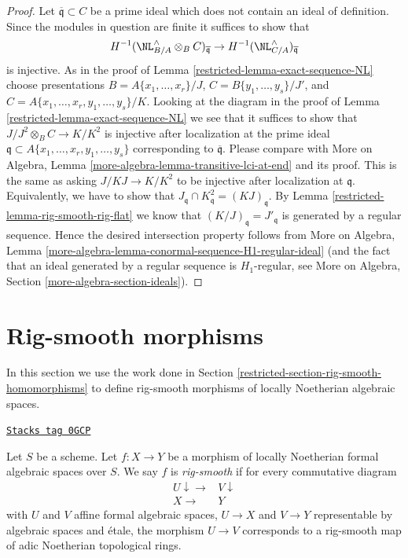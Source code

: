 \begin{proof}

Let $\overline{\mathfrak q} \subset C$ be a prime ideal which does not contain
an ideal of definition. Since the modules in question are finite
it suffices to show that
$$
H^{-1}(\NL_{B/A}^\wedge \otimes_B C)_{\overline{\mathfrak q}} \to
H^{-1}(\NL_{C/A}^\wedge)_{\overline{\mathfrak q}}
$$
is injective. As in the proof of Lemma \ref{restricted-lemma-exact-sequence-NL}
choose presentations $B = A\{x_1, \ldots, x_r\}/J$,
$C = B\{y_1, \ldots, y_s\}/J'$, and
$C = A\{x_1, \ldots, x_r, y_1, \ldots, y_s\}/K$.
Looking at the diagram in the proof of Lemma \ref{restricted-lemma-exact-sequence-NL}
we see that it suffices to show that $J/J^2 \otimes_B C \to K/K^2$
is injective after localization at the prime ideal
$\mathfrak q \subset A\{x_1, \ldots, x_r, y_1, \ldots, y_s\}$
corresponding to $\overline{\mathfrak q}$. Please compare with
More on Algebra, Lemma \ref{more-algebra-lemma-transitive-lci-at-end}
and its proof. This is the same as
asking $J/KJ \to K/K^2$ to be injective after localization
at $\mathfrak q$. Equivalently, we have to show that
$J_\mathfrak q \cap K^2_\mathfrak q = (KJ)_\mathfrak q$.
By Lemma \ref{restricted-lemma-rig-smooth-rig-flat}
we know that $(K/J)_\mathfrak q = J'_\mathfrak q$
is generated by a regular sequence.
Hence the desired intersection property follows from
More on Algebra, Lemma
\ref{more-algebra-lemma-conormal-sequence-H1-regular-ideal}
(and the fact that an ideal generated by a regular sequence
is $H_1$-regular, see
More on Algebra, Section \ref{more-algebra-section-ideals}).
\end{proof}

\section{Rig-smooth morphisms}
\label{restricted-section-rig-smooth-morphisms}
In this section we use the work done in
Section \ref{restricted-section-rig-smooth-homomorphisms}
to define rig-smooth morphisms of locally Noetherian algebraic spaces.

\begin{definition}
\label{restricted-definition-rig-smooth}
\href{https://stacks.math.columbia.edu/tag/0GCP}{\texttt{Stacks tag 0GCP}}

Let $S$ be a scheme. Let $f : X \to Y$ be a morphism of locally
Noetherian formal algebraic spaces over $S$. We say $f$ is
{\it rig-smooth} if for every commutative diagram
$$
\begin{array}{cc}U \downarrow\longrightarrow & V \downarrow \\ X \longrightarrow & Y\end{array}
$$
with $U$ and $V$ affine formal algebraic spaces, $U \to X$ and $V \to Y$
representable by algebraic spaces and \'etale, the morphism $U \to V$
corresponds to a rig-smooth map of adic Noetherian topological rings.
\end{definition}

